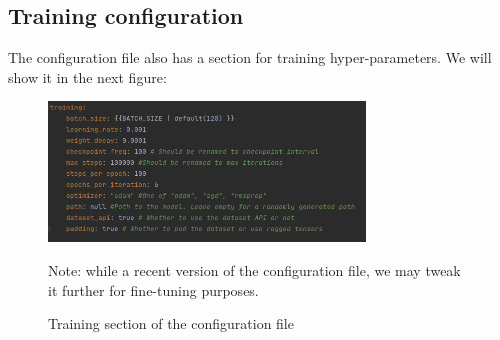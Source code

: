 \subsection{Training configuration}
The configuration file also has a section for training hyper-parameters. We will show it in the next figure:
\begin{figure}[H]
	\centering
	\includegraphics[width=0.75\textwidth]{Figures/TrainingConfiguration.png}
	\caption{Training section of the configuration file}
	\small{Note: while a recent version of the configuration file, we may tweak it further for fine-tuning purposes.}
\end{figure}